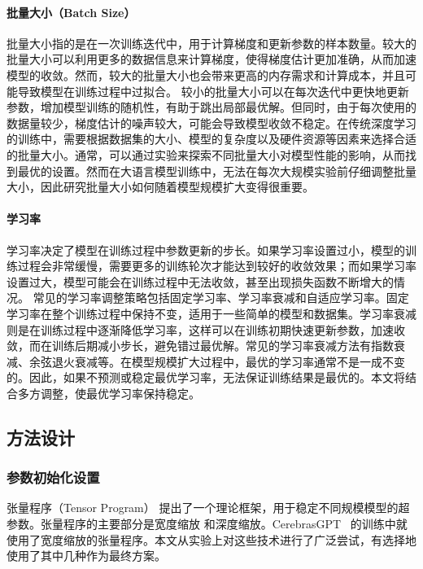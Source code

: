 \paragraph{批量大小（Batch Size）}
批量大小指的是在一次训练迭代中，用于计算梯度和更新参数的样本数量。较大的批量大小可以利用更多的数据信息来计算梯度，使得梯度估计更加准确，从而加速模型的收敛。然而，较大的批量大小也会带来更高的内存需求和计算成本，并且可能导致模型在训练过程中过拟合。
较小的批量大小可以在每次迭代中更快地更新参数，增加模型训练的随机性，有助于跳出局部最优解。但同时，由于每次使用的数据量较少，梯度估计的噪声较大，可能会导致模型收敛不稳定。在传统深度学习的训练中，需要根据数据集的大小、模型的复杂度以及硬件资源等因素来选择合适的批量大小。通常，可以通过实验来探索不同批量大小对模型性能的影响，从而找到最优的设置。然而在大语言模型训练中，无法在每次大规模实验前仔细调整批量大小，因此研究批量大小如何随着模型规模扩大变得很重要。

\paragraph{学习率}
学习率决定了模型在训练过程中参数更新的步长。如果学习率设置过小，模型的训练过程会非常缓慢，需要更多的训练轮次才能达到较好的收敛效果；而如果学习率设置过大，模型可能会在训练过程中无法收敛，甚至出现损失函数不断增大的情况。
常见的学习率调整策略包括固定学习率、学习率衰减和自适应学习率。固定学习率在整个训练过程中保持不变，适用于一些简单的模型和数据集。学习率衰减则是在训练过程中逐渐降低学习率，这样可以在训练初期快速更新参数，加速收敛，而在训练后期减小步长，避免错过最优解。常见的学习率衰减方法有指数衰减、余弦退火衰减等。在模型规模扩大过程中，最优的学习率通常不是一成不变的。因此，如果不预测或稳定最优学习率，无法保证训练结果是最优的。本文将结合多方调整，使最优学习率保持稳定。

\subsection {方法设计}
\subsubsection {参数初始化设置}
张量程序（Tensor Program）\citep{yang2022tensor, yang2023tensor} 提出了一个理论框架，用于稳定不同规模模型的超参数。张量程序的主要部分是宽度缩放\citep{yang2022tensor} 和深度缩放\citep{yang2023tensor}。CerebrasGPT~\citep{dey2023cerebras} 的训练中就使用了宽度缩放的张量程序。本文从实验上对这些技术进行了广泛尝试，有选择地使用了其中几种作为最终方案。

